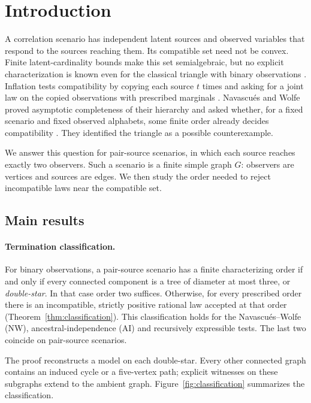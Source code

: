 \section{Introduction}\label{sec:intro}

A correlation scenario has independent latent sources and observed variables that respond to the sources reaching them. Its compatible set need not be convex. Finite latent-cardinality bounds make this set semialgebraic, but no explicit characterization is known even for the classical triangle with binary observations \cite{Fritz2012,RGW2018}. Inflation tests compatibility by copying each source $t$ times and asking for a joint law on the copied observations with prescribed marginals \cite{WSF2019}. Navascués and Wolfe proved asymptotic completeness of their hierarchy and asked whether, for a fixed scenario and fixed observed alphabets, some finite order already decides compatibility \cite{NW2020}. They identified the triangle as a possible counterexample.

We answer this question for pair-source scenarios, in which each source reaches exactly two observers. Such a scenario is a finite simple graph $G$: observers are vertices and sources are edges. We then study the order needed to reject incompatible laws near the compatible set.

\subsection{Main results}

\paragraph{Termination classification.}
For binary observations, a pair-source scenario has a finite characterizing order if and only if every connected component is a tree of diameter at most three, or \emph{double-star}. In that case order two suffices. Otherwise, for every prescribed order there is an incompatible, strictly positive rational law accepted at that order (Theorem~\ref{thm:classification}). This classification holds for the Navascués--Wolfe (NW), ancestral-independence (AI) and recursively expressible tests. The last two coincide on pair-source scenarios.

The proof reconstructs a model on each double-star. Every other connected graph contains an induced cycle or a five-vertex path; explicit witnesses on these subgraphs extend to the ambient graph. Figure~\ref{fig:classification} summarizes the classification.

